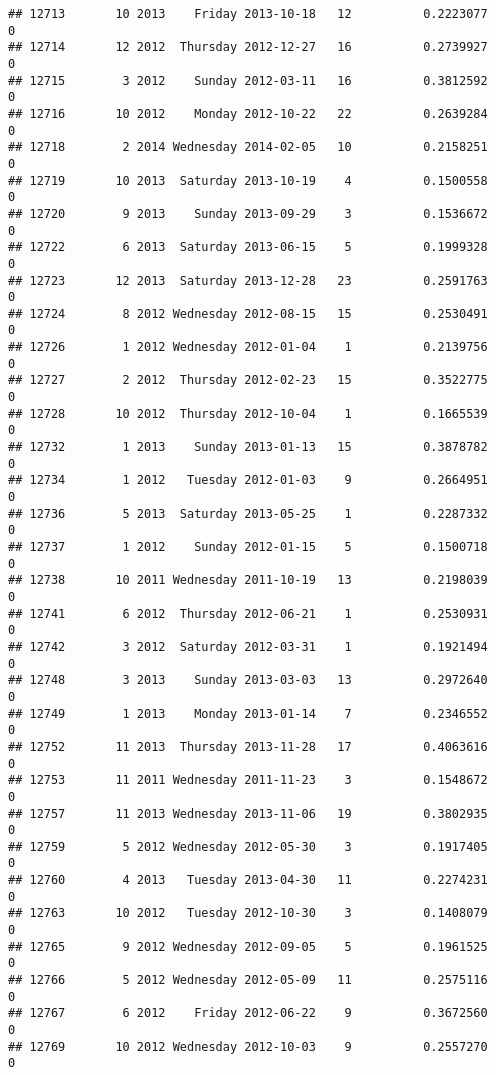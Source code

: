 \documentclass[
]{article}
\begin{document}
\begin{verbatim}
## 12713       10 2013    Friday 2013-10-18   12          0.2223077             0
## 12714       12 2012  Thursday 2012-12-27   16          0.2739927             0
## 12715        3 2012    Sunday 2012-03-11   16          0.3812592             0
## 12716       10 2012    Monday 2012-10-22   22          0.2639284             0
## 12718        2 2014 Wednesday 2014-02-05   10          0.2158251             0
## 12719       10 2013  Saturday 2013-10-19    4          0.1500558             0
## 12720        9 2013    Sunday 2013-09-29    3          0.1536672             0
## 12722        6 2013  Saturday 2013-06-15    5          0.1999328             0
## 12723       12 2013  Saturday 2013-12-28   23          0.2591763             0
## 12724        8 2012 Wednesday 2012-08-15   15          0.2530491             0
## 12726        1 2012 Wednesday 2012-01-04    1          0.2139756             0
## 12727        2 2012  Thursday 2012-02-23   15          0.3522775             0
## 12728       10 2012  Thursday 2012-10-04    1          0.1665539             0
## 12732        1 2013    Sunday 2013-01-13   15          0.3878782             0
## 12734        1 2012   Tuesday 2012-01-03    9          0.2664951             0
## 12736        5 2013  Saturday 2013-05-25    1          0.2287332             0
## 12737        1 2012    Sunday 2012-01-15    5          0.1500718             0
## 12738       10 2011 Wednesday 2011-10-19   13          0.2198039             0
## 12741        6 2012  Thursday 2012-06-21    1          0.2530931             0
## 12742        3 2012  Saturday 2012-03-31    1          0.1921494             0
## 12748        3 2013    Sunday 2013-03-03   13          0.2972640             0
## 12749        1 2013    Monday 2013-01-14    7          0.2346552             0
## 12752       11 2013  Thursday 2013-11-28   17          0.4063616             0
## 12753       11 2011 Wednesday 2011-11-23    3          0.1548672             0
## 12757       11 2013 Wednesday 2013-11-06   19          0.3802935             0
## 12759        5 2012 Wednesday 2012-05-30    3          0.1917405             0
## 12760        4 2013   Tuesday 2013-04-30   11          0.2274231             0
## 12763       10 2012   Tuesday 2012-10-30    3          0.1408079             0
## 12765        9 2012 Wednesday 2012-09-05    5          0.1961525             0
## 12766        5 2012 Wednesday 2012-05-09   11          0.2575116             0
## 12767        6 2012    Friday 2012-06-22    9          0.3672560             0
## 12769       10 2012 Wednesday 2012-10-03    9          0.2557270             0

\end{verbatim}
\end{document}
